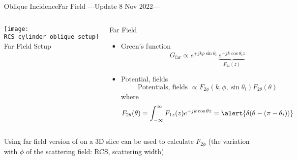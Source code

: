 \begin{frame}[allowframebreaks]{Oblique Incidence}{Far Field
    ---{Update 8 Nov 2022}---}

  \begin{columns}
     \centering
   \texttt{[image: RCS\_cylinder\_oblique\_setup]}
    \footnotesize{Far Field Setup}

    
     \centering
   \begin{block}{Far Field }
     \begin{itemize}
     \item Green's function
       \begin{equation*}
        G_\text{far} \propto
        e^{+j k \rho \sin\theta_i}\,
        \underbrace{ e^{-j k \cos\theta_i z}}_{F_{1z}(z)}
      \end{equation*}

    \item Potential, fields
      \begin{equation*}
        \text{Potentials, fields } \propto
        F_{2\phi}(k,\phi,\sin\theta_i) F_{2\theta}(\theta)
      \end{equation*}
      where
      \begin{equation*}
        F_{2\theta}(\theta) = \int_{-\infty}^\infty F_{1z}(z)e^{+j k \cos\theta z}
        = \alert{\delta(\theta-(\pi-\theta_i))}
      \end{equation*}
    \end{itemize}
    \end{block}

  \end{columns}

  \vspace{\baselineskip}
  
  \centering\parbox{0.9\linewidth}{\alert{Using far field version of {\GreenD} on a 3D
      slice can be used to calculate $F_{2\phi}$ (the variation
      with $\phi$ of the scattering field: RCS, scattering
      width)} %
  }


  \framebreak %
  

\end{frame}

